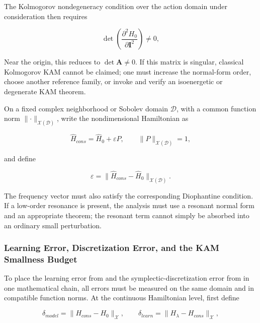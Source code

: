 The Kolmogorov nondegeneracy condition over the action domain under consideration then requires

\begin{equation}
\label{eq:hamiltonian-3-86}
\boxed{\det\left( \frac{\partial^{2}H_{0}}{\partial\mathbf{I}^{2}} \right) \neq 0,}
\end{equation}

Near the origin, this reduces to \(\det\mathbf{A}\neq0\). If this matrix is singular, classical Kolmogorov KAM cannot be claimed; one must increase the normal-form order, choose another reference family, or invoke and verify an isoenergetic or degenerate KAM theorem.

On a fixed complex neighborhood or Sobolev domain \(\mathcal{D}\), with a common function norm \(\parallel \cdot \parallel_{\mathcal{X}\left( \mathcal{D} \right)}\), write the nondimensional Hamiltonian as

\begin{equation}
\label{eq:hamiltonian-3-87}
{\widehat{H}}_{cons} = {\widehat{H}}_{0} + \varepsilon P,\quad\quad \parallel P \parallel_{\mathcal{X}\left( \mathcal{D} \right)} = 1,
\end{equation}

and define

\begin{equation}
\label{eq:hamiltonian-3-88}
\boxed{\varepsilon = \left. \parallel{\widehat{H}}_{cons} - {\widehat{H}}_{0} \right.\parallel_{\mathcal{X}\left( \mathcal{D} \right)}.}
\end{equation}

The frequency vector must also satisfy the corresponding Diophantine condition. If a low-order resonance is present, the analysis must use a resonant normal form and an appropriate theorem; the resonant term cannot simply be absorbed into an ordinary small perturbation.

\subsubsection{Learning Error, Discretization Error, and the KAM Smallness Budget}\label{sec:hamiltonian-3-7-4}

To place the learning error from  and the symplectic-discretization error from  in one mathematical chain, all errors must be measured on the same domain and in compatible function norms. At the continuous Hamiltonian level, first define

\begin{equation}
\label{eq:hamiltonian-3-89}
\delta_{model} = \parallel H_{cons} - H_{0} \parallel_{\mathcal{X}},\quad\quad\delta_{learn} = \parallel H_{\lambda} - H_{cons} \parallel_{\mathcal{X}},
\end{equation}

